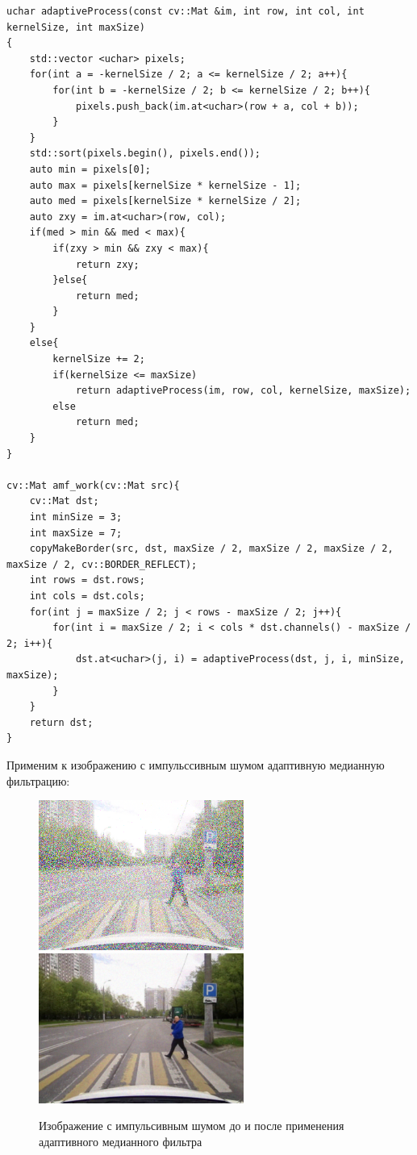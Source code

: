 \begin{lstlisting}[style=cpp_white, caption={Функции для применения адаптивного медианного фильтра}]
uchar adaptiveProcess(const cv::Mat &im, int row, int col, int kernelSize, int maxSize)
{
    std::vector <uchar> pixels;
    for(int a = -kernelSize / 2; a <= kernelSize / 2; a++){
        for(int b = -kernelSize / 2; b <= kernelSize / 2; b++){
            pixels.push_back(im.at<uchar>(row + a, col + b));
        }
    }
    std::sort(pixels.begin(), pixels.end());
    auto min = pixels[0];
    auto max = pixels[kernelSize * kernelSize - 1];
    auto med = pixels[kernelSize * kernelSize / 2];
    auto zxy = im.at<uchar>(row, col);
    if(med > min && med < max){
        if(zxy > min && zxy < max){
            return zxy;
        }else{
            return med;
        }
    }
    else{
        kernelSize += 2;
        if(kernelSize <= maxSize)
            return adaptiveProcess(im, row, col, kernelSize, maxSize);
        else
            return med;
    }
}

cv::Mat amf_work(cv::Mat src){
    cv::Mat dst;
    int minSize = 3;
    int maxSize = 7; 
    copyMakeBorder(src, dst, maxSize / 2, maxSize / 2, maxSize / 2, maxSize / 2, cv::BORDER_REFLECT);
    int rows = dst.rows;
    int cols = dst.cols;
    for(int j = maxSize / 2; j < rows - maxSize / 2; j++){
        for(int i = maxSize / 2; i < cols * dst.channels() - maxSize / 2; i++){
            dst.at<uchar>(j, i) = adaptiveProcess(dst, j, i, minSize, maxSize);
        }
    }
    return dst;
}
\end{lstlisting}

Применим к изображению с импульссивным шумом адаптивную медианную фильтрацию:

\begin{figure}[hbt!]
    \centering
    \includegraphics[width=0.6\textwidth]{../outputs/image_impulse_noise.png}
    \includegraphics[width=0.6\textwidth]{../outputs/image_quant_filter.png}
    \caption{Изображение с импульсивным шумом до и после применения адаптивного медианного фильтра}
    \label{fig:stich_images}
\end{figure}

